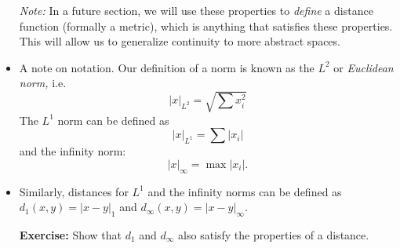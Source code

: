 \begin{itemize}
    \textit{Note:} In a future section, we will use these properties to \textit{define} a distance function (formally a metric), which is anything that satisfies these properties. This will allow us to generalize continuity to more abstract spaces.
    \item A note on notation. Our definition of a norm is known as the $L^2$ or \textit{Euclidean norm,} i.e.
    \begin{equation}
        |x|_{L^2} = \sqrt{\sum x_i^2}
    \end{equation}
    The $L^1$ norm can be defined as
    \begin{equation}
        |x|_{L^1} = \sum |x_i|
    \end{equation}
    and the infinity norm: 
    \begin{equation}
        |x|_\infty = \max|x_i|.
    \end{equation}
    \item Similarly, distances for $L^1$ and the infinity norms can be defined as $d_1(x,y)=|x-y|_1$ and $d_\infty(x,y)=|x-y|_\infty$.
    
    \textbf{Exercise:} Show that $d_1$ and $d_\infty$ also satisfy the properties of a distance.


\end{itemize}
